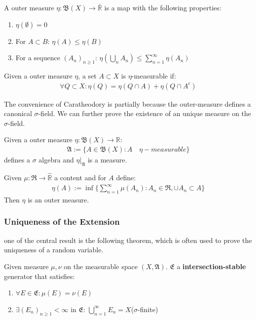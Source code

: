 \begin{definition}
	A outer measure $\eta: \mathfrak{B}(X) \rightarrow \bar{\mathbb{R}}$ is a map with the following properties:
	\begin{enumerate}
		\item $\eta(\emptyset) = 0$
		\item For $A \subset B$: $\eta(A) \leq \eta(B)$
		\item For a sequence $(A_n)_{n \geq 1}$: $\eta(\bigcup_n A_n) \leq \sum_{n = 1}^\infty \eta(A_n)$
	\end{enumerate}
\end{definition}

\begin{definition}
	Given a outer measure $\eta$, a set $A \subset X$ is $\eta$-measurable if:
	\begin{align*}
		\forall Q \subset X: \eta(Q) = \eta(Q \cap A) + \eta(Q \cap A^c)
	\end{align*}
\end{definition}

The convenience of Caratheodory is partially because the outer-measure defines a canonical $\sigma$-field. We can further prove the existence of an unique measure on the $\sigma$-field.
\begin{theorem}[Caratheodory]
	Given a outer measure $\eta: \mathfrak{B}(X) \rightarrow \mathbb{R}$:
	\begin{align*}
		\mathfrak{A}:= \{ A \in \mathfrak{B}(X): A \quad \eta-measurable \}
	\end{align*}
	defines a $\sigma$ algebra and $\eta|_{\mathfrak{A}}$ is a measure.
\end{theorem}

\begin{theorem}
	Given $\mu: \mathfrak{R} \rightarrow \widehat{\mathbb{R}}$ a content and for $A$ define:
	\begin{align*}
		\eta(A):= \inf\{\sum_{n = 1}^\infty \mu(A_n): A_n \in \mathfrak{R}, \cup A_n \subset A \}
	\end{align*}
	Then $\eta$ is an outer measure.
\end{theorem}

\subsubsection*{Uniqueness of the Extension}
one of the central result is the following theorem, which is often used to prove the uniqueness of a random variable.
\begin{theorem}
	Given measure $\mu, \nu$ on the measurable space $(X, \mathfrak{A})$. $\mathfrak{E}$ a \textbf{intersection-stable }generator that satisfies:
	\begin{enumerate}
		\item $\forall E \in \mathfrak{E}: \mu(E) = \nu(E)$
		\item $\exists (E_n)_{n\geq 1} < \infty$ in $\mathfrak{E}$: $\bigcup_{n = 1}^\infty E_n = X$($\sigma$-finite)
	\end{enumerate}
\end{theorem}

